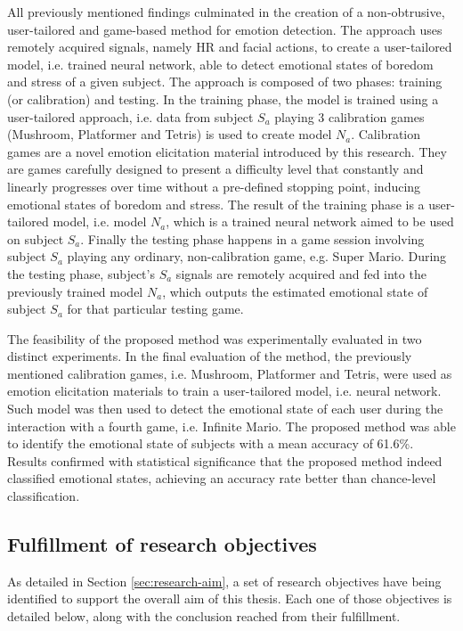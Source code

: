 All previously mentioned findings culminated in the creation of a non-obtrusive, user-tailored and game-based method for emotion detection. The approach uses remotely acquired signals, namely HR and facial actions, to create a user-tailored model, i.e. trained neural network, able to detect emotional states of boredom and stress of a given subject. The approach is composed of two phases: training (or calibration) and testing. In the training phase, the model is trained using a user-tailored approach, i.e. data from subject $S_a$ playing 3 calibration games (Mushroom, Platformer and Tetris) is used to create model $N_a$. Calibration games are a novel emotion elicitation material introduced by this research. They are games carefully designed to present a difficulty level that constantly and linearly progresses over time without a pre-defined stopping point, inducing emotional states of boredom and stress. The result of the training phase is a user-tailored model, i.e. model $N_a$, which is a trained neural network aimed to be used on subject $S_a$. Finally the testing phase happens in a game session involving subject $S_a$ playing any ordinary, non-calibration game, e.g. Super Mario. During the testing phase, subject's $S_a$ signals are remotely acquired and fed into the previously trained model $N_a$, which outputs the estimated emotional state of subject $S_a$ for that particular testing game.

The feasibility of the proposed method was experimentally evaluated in two distinct experiments. In the final evaluation of the method, the previously mentioned calibration games, i.e. Mushroom, Platformer and Tetris, were used as emotion elicitation materials to train a user-tailored model, i.e. neural network. Such model was then used to detect the emotional state of each user during the interaction with a fourth game, i.e. Infinite Mario. The proposed method was able to identify the emotional state of subjects with a mean accuracy of 61.6\%. Results confirmed with statistical significance that the proposed method indeed classified emotional states, achieving an accuracy rate better than chance-level classification.

\subsection{Fulfillment of research objectives}

As detailed in Section \ref{sec:research-aim}, a set of research objectives have being identified to support the overall aim of this thesis. Each one of those objectives is detailed below, along with the conclusion reached from their fulfillment.


